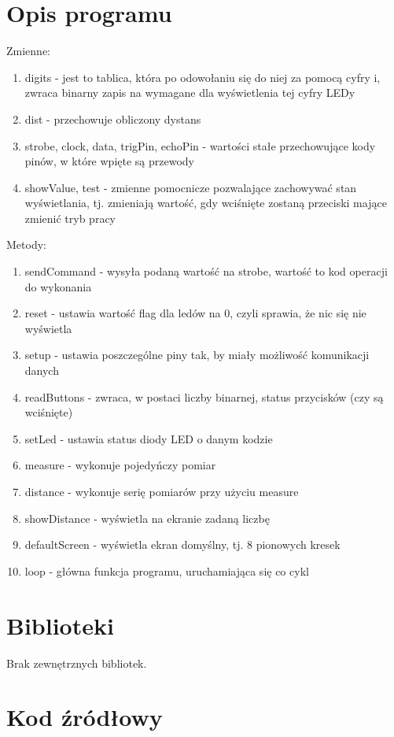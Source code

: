 \documentclass{article}
\begin{document}
\section{Opis programu}

Zmienne:
 \begin{enumerate}
 	\item digits - jest to tablica, która po odowołaniu się do niej za pomocą cyfry i, zwraca binarny zapis na wymagane dla wyświetlenia tej cyfry LEDy
 	\item dist - przechowuje obliczony dystans
 	\item strobe, clock, data, trigPin, echoPin - wartości stałe przechowujące kody pinów, w które wpięte są przewody
 	\item showValue, test - zmienne pomocnicze pozwalające zachowywać stan wyświetlania, tj. zmieniają wartość, gdy wciśnięte zostaną przeciski mające zmienić tryb pracy
 \end{enumerate}

Metody:
 \begin{enumerate}
 	\item sendCommand - wysyła podaną wartość na strobe, wartość to kod operacji do wykonania
 	\item reset - ustawia wartość flag dla ledów na 0, czyli sprawia, że nic się nie wyświetla
 	\item setup - ustawia poszczególne piny tak, by miały możliwość komunikacji danych
 	\item readButtons - zwraca, w postaci liczby binarnej, status przycisków (czy są wciśnięte)
 	\item setLed - ustawia status diody LED o danym kodzie
 	\item measure - wykonuje pojedyńczy pomiar
 	\item distance - wykonuje serię pomiarów przy użyciu measure
 	\item showDistance - wyświetla na ekranie zadaną liczbę
 	\item defaultScreen - wyświetla ekran domyślny, tj. 8 pionowych kresek
 	\item loop - główna funkcja programu, uruchamiająca się co cykl
 \end{enumerate}

\section{Biblioteki}
Brak zewnętrznych bibliotek.

\section{Kod źródłowy}

\end{document}
